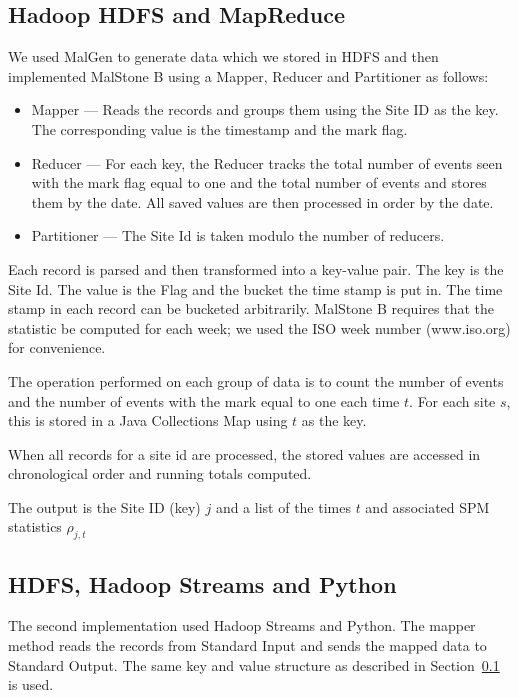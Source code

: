 \documentclass{acm_proc_article-sp}
\def\malstone{MalStone } \def\malgen{MalGen }
\begin{document}
\subsection{Hadoop HDFS and MapReduce}
\label{section-hadoop}

We used \malgen to generate data which we stored in HDFS and then
implemented \malstone B using a Mapper, Reducer and Partitioner as follows:

\begin{itemize}

\item Mapper --- Reads the records and groups them using the Site ID
as the key.  The corresponding value is the timestamp and the mark flag.

\item Reducer --- For each key, the Reducer tracks the total number of
  events seen with the mark flag equal to one and the total number of
  events and stores them by the date.  All saved values are then
  processed in order by the date.

\item Partitioner --- The Site Id is taken modulo the number of reducers.

\end{itemize}

Each record is parsed and then transformed into a key-value pair.  The
key is the Site Id.  The value is the Flag and the bucket the time
stamp is put in.  The time stamp in each record can be bucketed
arbitrarily.  \malstone B requires that the statistic be computed for
each week; we used the ISO week number (www.iso.org) for convenience.

The operation performed on each group of data is to count the number
of events and the number of events with the mark equal to one
each time $t$.  For each site $s$, this is stored in a Java Collections
Map using $t$ as the key.

When all records for a site id are processed, the stored values are
accessed in chronological order and running totals computed.

The output is the Site ID (key) $j$ and a list of the times $t$ and 
associated SPM statistics $\rho_{j,t}$

\subsection{HDFS, Hadoop Streams and Python}

The second implementation used Hadoop Streams \cite{Hadoop:2010} and 
Python.  The mapper method reads the records from Standard Input
and sends the mapped data to Standard Output.  The same key and value structure
as described in Section~\ref{section-hadoop} is used.
\end{document}
